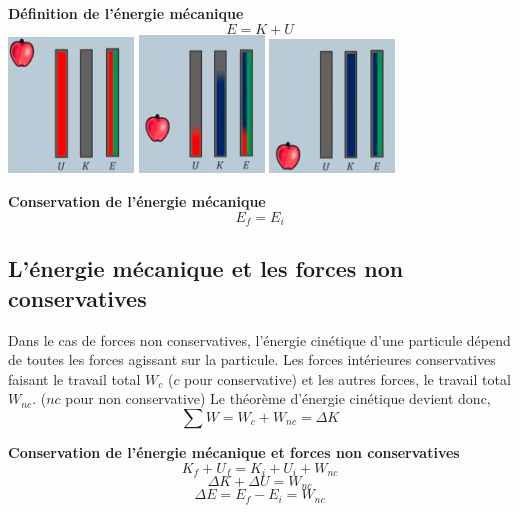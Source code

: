 \documentclass{article}
\begin{document}
\noindent
\textbf{Définition de l'énergie mécanique}
\[E = K + U\]
\includegraphics[width=0.25\textwidth]{Image/PotentielleInitial.png}
\hfill
\includegraphics[width=0.25\textwidth]{Image/PotetielleSinetique.png}
\hfill
\includegraphics[width=0.25\textwidth]{Image/PotentielleFinal.png}
\newline

\noindent
\textbf{Conservation de l'énergie mécanique}
\[E_f = E_i\]

\subsection{L'énergie mécanique et les forces non conservatives}
Dans le cas de forces non conservatives, l'énergie cinétique d'une particule dépend de toutes les forces agissant sur la particule. Les forces intérieures conservatives faisant le travail total $W_c$ ($c$ pour conservative) et les autres forces, le travail total $W_{nc}$. ($nc$ pour non conservative)
\newline
Le théorème d'énergie cinétique devient donc,
\[\sum W = W_c + W_{nc} = \Delta K\]
\newline

\noindent
\textbf{Conservation de l'énergie mécanique et forces non conservatives}
\[K_f + U_f = K_i + U_i + W_{nc}\]
\[\Delta K + \Delta U = W_{nc}\]
\[\Delta E = E_f - E_i = W_{nc}\]
\end{document}
